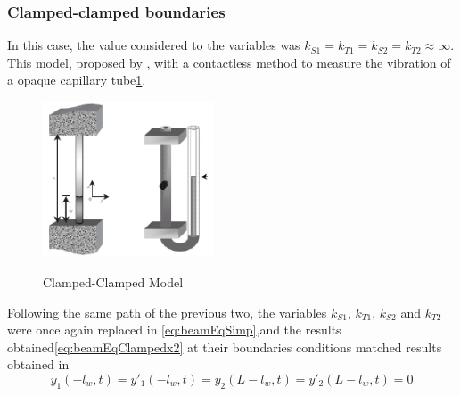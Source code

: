     \subsubsection{Clamped-clamped boundaries}
    In this case, the value considered to the variables was $k_{S1}=k_{T1}=k_{S2}=k_{T2}\approx\infty$. This model, proposed by \citeauthor{jacobsContactlessLiquidDetection2005}, with a contactless method to measure the vibration of a opaque capillary tube\ref{fig:clampedclampedmodel}.
    \begin{figure}[!htb]
        \centering
        \includegraphics[width=0.45\textwidth]{Chapters/2CHP/Diagrams/clampedclampedmodel1.pdf}
        \caption{Clamped-Clamped Model}{\cite{jacobsContactlessLiquidDetection2005}}
        \label{fig:clampedclampedmodel}
    \end{figure}
    Following the same path of the previous two, the variables $k_{S1}$, $k_{T1}$, $k_{S2}$ and $k_{T2}$ were once again replaced in \ref{eq:beamEqSimp},and the results obtained\ref{eq:beamEqClampedx2} at their boundaries conditions matched results obtained in \cite{jacobsContactlessLiquidDetection2005}
    \begin{equation} \label{eq:beamEqClampedx2}
        y_1(-l_w,t) = y'_1(-l_w,t) = y_2(L-l_w,t) = y'_2(L-l_w,t)=0
    \end{equation}

